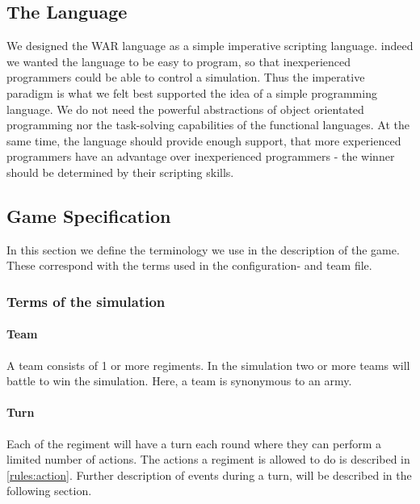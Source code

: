 	\subsection{The Language}
		We designed the WAR language as a simple imperative scripting language. 
		indeed we wanted the language to be easy to program, so that inexperienced programmers could be able to control a simulation. Thus the imperative paradigm is what we felt best supported the idea of a simple programming language. We do not need the
		powerful abstractions of object orientated programming nor the task-solving capabilities of the functional languages. At the same time, the language should provide enough support, that more experienced programmers have an advantage over inexperienced programmers - the winner should be determined by their scripting skills.
		
		 
	\subsection{Game Specification}
	In this section we define the terminology we use in the description of the game. \\
	These correspond with the terms used in the configuration- and team file.
	
		\subsubsection{Terms of the simulation}
		
		\paragraph{Team}		
		A team consists of 1 or more regiments. In the simulation two or more teams will battle to win the simulation. Here, a team is synonymous to an army.
		
		\paragraph{Turn}
		Each of the regiment will have a turn each round where they can perform a limited number of actions. 
		The actions a regiment is allowed to do is described in \ref{rules:action}.
		Further description of events during a turn, will be described in the following section.
		
